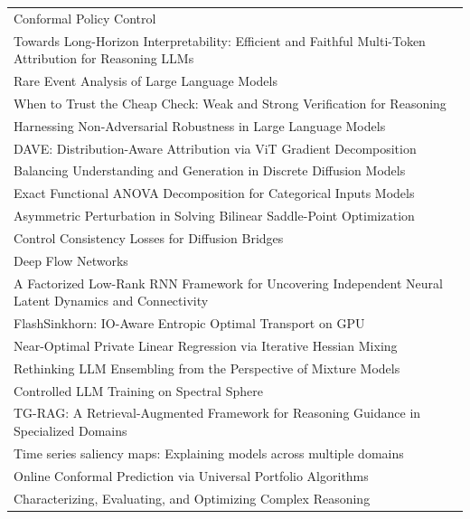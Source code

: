 \begin{table}[!ht]
{\begin{tabular}{l}
Conformal Policy Control \citep{prinster2026conformal}\\
Towards Long-Horizon Interpretability: Efficient and Faithful Multi-Token Attribution for Reasoning LLMs \citep{pan2026towards}\\
Rare Event Analysis of Large Language Models \citep{dorman2026rare}\\
When to Trust the Cheap Check: Weak and Strong Verification for Reasoning \citep{kiyani2026when}\\
Harnessing Non-Adversarial Robustness in Large Language Models \citep{zhou2026harnessing}\\
DAVE: Distribution-Aware Attribution via ViT Gradient Decomposition \citep{wrobel2026dave}\\
Balancing Understanding and Generation in Discrete Diffusion Models \citep{liu2026balancing}\\
Exact Functional ANOVA Decomposition for Categorical Inputs Models \citep{ferrere2026exact}\\
Asymmetric Perturbation in Solving Bilinear Saddle-Point Optimization \citep{abe2026asymmetric}\\
Control Consistency Losses for Diffusion Bridges \citep{howard2026control}\\
Deep Flow Networks \citep{candogan2026deep}\\
A Factorized Low-Rank RNN Framework for Uncovering Independent Neural Latent Dynamics and Connectivity \citep{li2026a}\\
FlashSinkhorn: IO-Aware Entropic Optimal Transport on GPU \citep{ye2026flashsinkhorn}\\
Near-Optimal Private Linear Regression via Iterative Hessian Mixing \citep{lev2026nearoptimal}\\
Rethinking LLM Ensembling from the Perspective of Mixture Models \citep{fu2026rethinking}\\
Controlled LLM Training on Spectral Sphere \citep{xie2026controlled}\\
TG-RAG: A Retrieval-Augmented Framework for Reasoning Guidance in Specialized Domains \citep{su2026tgrag}\\
Time series saliency maps: Explaining models across multiple domains \citep{kechris2026time}\\
Online Conformal Prediction via Universal Portfolio Algorithms \citep{liu2026online}\\
Characterizing, Evaluating, and Optimizing Complex Reasoning \citep{zhang2026characterizing}\\

\end{tabular}}
\end{table}
